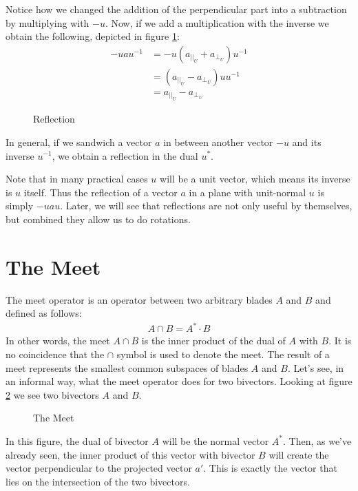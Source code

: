 \documentclass[10pt]{report}
\begin{document}
Notice how we changed the addition of the perpendicular part into
a subtraction by multiplying with $-u$. Now, if we add a
multiplication with the inverse we obtain the following, depicted
in figure \ref{fig:reflection}:
\begin{align*}
    -uau^{-1} &= -u(a_{||_{U}} + a_{\bot_{U}})u^{-1} \\
              &= (a_{||_{U}} - a_{\bot_{U}})uu^{-1} \\
              &= a_{||_{U}} - a_{\bot_{U}}
\end{align*}
\begin{figure}[ht]
\centering

\caption{Reflection} \label{fig:reflection}
\end{figure}
In general, if we sandwich a vector $a$ in between another vector
$-u$ and its inverse $u^{-1}$, we obtain a reflection in the dual
$u^*$.

Note that in many practical cases $u$ will be a unit vector, which
means its inverse is $u$ itself. Thus the reflection of a vector
$a$ in a plane with unit-normal $u$ is simply $-uau$. Later, we
will see that reflections are not only useful by themselves, but
combined they allow us to do rotations.

\newpage

\section{The Meet}

The meet operator is an operator between two arbitrary blades $A$
and $B$ and defined as follows:
\begin{align*}
    A\cap B = A^* \cdot B
\end{align*}
In other words, the meet $A\cap B$ is the inner product of the
dual of $A$ with $B$. It is no coincidence that the $\cap$ symbol
is used to denote the meet. The result of a meet represents the
smallest common subspaces of blades $A$ and $B$. Let's see, in an
informal way, what the meet operator does for two bivectors.
Looking at figure \ref{fig:meet} we see two bivectors $A$ and $B$.
\begin{figure}[ht]
\centering

\caption{The Meet} \label{fig:meet}
\end{figure}

In this figure, the dual of bivector $A$ will be the normal vector
$A^*$. Then, as we've already seen, the inner product of this
vector with bivector $B$ will create the vector perpendicular to
the projected vector $a'$. This is exactly the vector that lies on
the intersection of the two bivectors.
\end{document}
